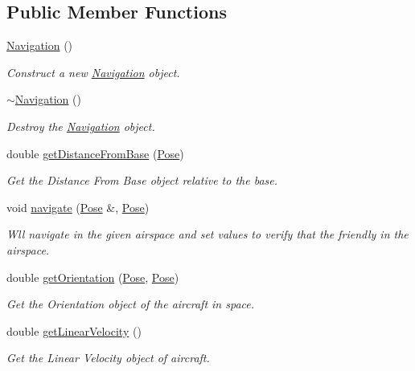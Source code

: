 \subsection*{Public Member Functions}
\begin{DoxyCompactItemize}
\item 
\hyperlink{classNavigation_a81fdffdefe46340da5fa6c570066b42b}{Navigation} ()
\begin{DoxyCompactList}\small\item\em Construct a new \hyperlink{classNavigation}{Navigation} object. \end{DoxyCompactList}\item 
\mbox{\label{classNavigation_addd4022d716df48f4e55a1db69361ba7}} 
\hyperlink{classNavigation_addd4022d716df48f4e55a1db69361ba7}{$\sim$\+Navigation} ()
\begin{DoxyCompactList}\small\item\em Destroy the \hyperlink{classNavigation}{Navigation} object. \end{DoxyCompactList}\item 
double \hyperlink{classNavigation_ac417c0408968151493e5dccefae38bc7}{get\+Distance\+From\+Base} (\hyperlink{structPose}{Pose})
\begin{DoxyCompactList}\small\item\em Get the Distance From Base object relative to the base. \end{DoxyCompactList}\item 
void \hyperlink{classNavigation_a91cfc3f3fa511684efd25c7a03a9a7c6}{navigate} (\hyperlink{structPose}{Pose} \&, \hyperlink{structPose}{Pose})
\begin{DoxyCompactList}\small\item\em Wll navigate in the given airspace and set values to verify that the friendly in the airspace. \end{DoxyCompactList}\item 
double \hyperlink{classNavigation_a18d539b159c80fd2d1af2021ad6d3947}{get\+Orientation} (\hyperlink{structPose}{Pose}, \hyperlink{structPose}{Pose})
\begin{DoxyCompactList}\small\item\em Get the Orientation object of the aircraft in space. \end{DoxyCompactList}\item 
double \hyperlink{classNavigation_a9aef484e223556a207734159612fb2c9}{get\+Linear\+Velocity} ()
\begin{DoxyCompactList}\small\item\em Get the Linear Velocity object of aircraft. \end{DoxyCompactList}\item 

\end{DoxyCompactItemize}

